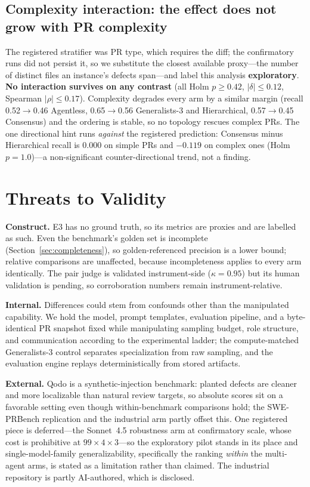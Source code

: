 \documentclass[conference]{IEEEtran}
\begin{document}
\subsection{Complexity interaction: the effect does not grow with PR complexity}
\label{sec:rq3}
The registered stratifier was PR type, which requires the diff; the confirmatory
runs did not persist it, so we substitute the closest available proxy---the
number of distinct files an instance's defects span---and label this analysis
\textbf{exploratory}. \textbf{No interaction survives on any contrast} (all Holm
$p{\ge}0.42$, $|\delta|{\le}0.12$, Spearman $|\rho|{\le}0.17$). Complexity
degrades every arm by a similar margin (recall 0.52$\to$0.46 Agentless,
0.65$\to$0.56 Generalists-3 and Hierarchical, 0.57$\to$0.45 Consensus) and the
ordering is stable, so no topology rescues complex PRs. The one directional hint
runs \emph{against} the registered prediction: Consensus minus Hierarchical
recall is 0.000 on simple PRs and $-0.119$ on complex ones (Holm $p{=}1.0$)---a
non-significant counter-directional trend, not a finding.

\section{Threats to Validity}
\label{sec:threats}

\textbf{Construct.} E3 has no ground truth, so its metrics are proxies and are
labelled as such. Even the benchmark's golden set is incomplete
(Section~\ref{sec:completeness}), so golden-referenced precision is a lower bound;
relative comparisons are unaffected, because incompleteness applies to every arm
identically. The pair judge is validated instrument-side ($\kappa{=}0.95$) but its
human validation is pending, so corroboration numbers remain instrument-relative.

\textbf{Internal.} Differences could stem from confounds other than the
manipulated capability. We hold the model, prompt templates, evaluation pipeline,
and a byte-identical PR snapshot fixed while manipulating sampling budget, role
structure, and communication according to the experimental ladder; the
compute-matched Generalists-3 control separates specialization from raw sampling,
and the evaluation engine replays deterministically from stored artifacts.

\textbf{External.} Qodo is a synthetic-injection benchmark: planted defects are
cleaner and more localizable than natural review targets, so absolute scores sit
on a favorable setting even though within-benchmark comparisons hold; the
SWE-PRBench replication and the industrial arm partly offset this. One registered
piece is deferred---the Sonnet~4.5 robustness arm at confirmatory scale, whose
cost is prohibitive at $99\times4\times3$---so the exploratory pilot stands in its
place and single-model-family generalizability, specifically the ranking
\emph{within} the multi-agent arms, is stated as a limitation rather than claimed.
The industrial repository is partly AI-authored, which is disclosed.
\end{document}
